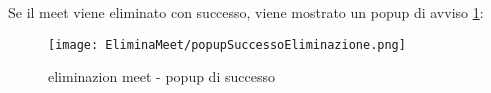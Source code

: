 Se il meet viene eliminato con successo, viene mostrato un popup di avviso \ref{Eliminazion_meet_popup_di_successo}:
\begin{figure}[H]
    \centering
    \texttt{[image: EliminaMeet/popupSuccessoEliminazione.png]}
    \caption{eliminazion meet - popup di successo}
    \label{Eliminazion_meet_popup_di_successo}
\end{figure}
